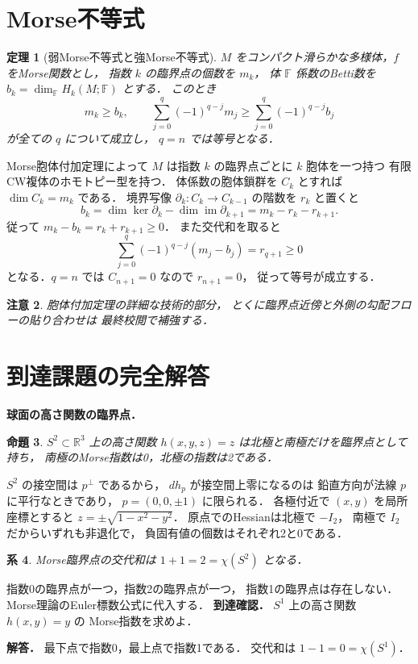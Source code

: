 \documentclass[a5paper,10pt,onecolumn]{jsarticle}
\makeatletter
\theoremstyle{mathnotetheorem}
\newtheorem{theorem}{定理}[section]
\newtheorem{proposition}[theorem]{命題}
\newtheorem{corollary}[theorem]{系}
\newtheorem{remark}[theorem]{注意}
\renewcommand{\proofname}{証明}
\renewenvironment{proof}[1][\proofname]{%
  \par\pushQED{\qed}\normalfont\topsep4\p@\@plus2\p@\relax
  \trivlist\item[\hskip\labelsep\bfseries #1]\ignorespaces
}{\popQED\endtrivlist\@endpefalse}
\makeatother
\begin{document}
\section{Morse不等式}
\begin{theorem}[弱Morse不等式と強Morse不等式]\label{thm:inequality}
$M$ をコンパクト滑らかな多様体，$f$ をMorse関数とし，
指数 $k$ の臨界点の個数を $m_k$，
体 $\mathbb F$ 係数のBetti数を
$b_k=\dim_{\mathbb F}H_k(M;\mathbb F)$ とする．
このとき
\[
 m_k\ge b_k,\qquad
 \sum_{j=0}^q(-1)^{q-j}m_j
 \ge\sum_{j=0}^q(-1)^{q-j}b_j
\]
が全ての $q$ について成立し，
$q=n$ では等号となる．
\end{theorem}
\begin{proof}
Morse胞体付加定理によって
$M$ は指数 $k$ の臨界点ごとに $k$ 胞体を一つ持つ
有限CW複体のホモトピー型を持つ．
体係数の胞体鎖群を $C_k$ とすれば
$\dim C_k=m_k$ である．
境界写像 $\partial_k:C_k\to C_{k-1}$ の階数を
$r_k$ と置くと
\[
 b_k=\dim\ker\partial_k-\dim\operatorname{im}\partial_{k+1}
 =m_k-r_k-r_{k+1}.
\]
従って $m_k-b_k=r_k+r_{k+1}\ge0$．
また交代和を取ると
\[
 \sum_{j=0}^q(-1)^{q-j}(m_j-b_j)=r_{q+1}\ge0
\]
となる．$q=n$ では $C_{n+1}=0$ なので $r_{n+1}=0$，
従って等号が成立する．
\end{proof}
\begin{remark}
胞体付加定理の詳細な技術的部分，
とくに臨界点近傍と外側の勾配フローの貼り合わせは
最終校閲で補強する．
\end{remark}

\section{到達課題の完全解答}
\noindent\textbf{球面の高さ関数の臨界点．}
\begin{proposition}
$S^2\subset\mathbb R^3$ 上の高さ関数
$h(x,y,z)=z$ は北極と南極だけを臨界点として持ち，
南極のMorse指数は0，北極の指数は2である．
\end{proposition}
\begin{proof}
$S^2$ の接空間は $p^\perp$ であるから，
$dh_p$ が接空間上零になるのは
鉛直方向が法線 $p$ に平行なときであり，
$p=(0,0,\pm1)$ に限られる．
各極付近で $(x,y)$ を局所座標とすると
$z=\pm\sqrt{1-x^2-y^2}$．
原点でのHessianは北極で $-I_2$，
南極で $I_2$ だからいずれも非退化で，
負固有値の個数はそれぞれ2と0である．
\end{proof}
\begin{corollary}
Morse臨界点の交代和は
$1+1=2=\chi(S^2)$ となる．
\end{corollary}
\begin{proof}
指数0の臨界点が一つ，指数2の臨界点が一つ，
指数1の臨界点は存在しない．
Morse理論のEuler標数公式に代入する．
\end{proof}
\noindent\textbf{到達確認．}
$S^1$ 上の高さ関数 $h(x,y)=y$ の
Morse指数を求めよ．
\par\noindent\textbf{解答．}
最下点で指数0，最上点で指数1である．
交代和は $1-1=0=\chi(S^1)$．
\end{document}
